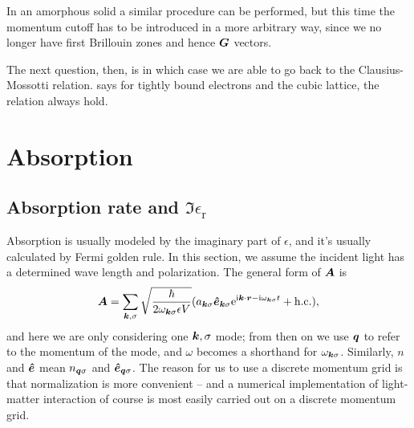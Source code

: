 \documentclass[hyperref, a4paper, 12pt]{report}
\newcommand*{\ii}{\mathrm{i}}
\newcommand*{\ee}{\mathrm{e}}
\begin{document}
In an amorphous solid a similar procedure can be performed, 
but this time the momentum cutoff has to be introduced 
in a more arbitrary way,
since we no longer have first Brillouin zones 
and hence $\vb*{G}$ vectors. 

The next question, then, is in which case we are able to 
go back to the Clausius-Mossotti relation.
\cite{wider63} says for tightly bound electrons 
and the cubic lattice, 
the relation always hold.

\section{Absorption}

\subsection{Absorption rate and $\Im \epsilon_{\text{r}}$}

Absorption is usually modeled by the imaginary part of $\epsilon$,
and it's usually calculated by Fermi golden rule.
In this section, we assume the incident light 
has a determined wave length and polarization.
The general form of $\vb*{A}$ is 
\begin{equation}
    \vb*{A} = \sum_{\vb*{k}, \sigma}
        \sqrt{\frac{\hbar}{2 \omega_{\vb*{k} \sigma} \epsilon V}}
        (
            a_{\vb*{k} \sigma} \vu*{e}_{\vb*{k} \sigma} 
            \ee^{\ii \vb*{k} \cdot \vb*{r} - \ii \omega_{\vb*{k} \sigma} t}
            + \text{h.c.}
        ),
    \label{eq:a-and-photon}
\end{equation}
and here we are only considering one $\vb*{k}, \sigma$ mode; 
from then on we use $\vb*{q}$ to refer to the momentum of the mode,
and $\omega$ becomes a shorthand for $\omega_{\vb*{k} \sigma}$.
Similarly, $n$ and $\vu*{e}$ mean 
$n_{\vb*{q} \sigma}$ and $\vu*{e}_{\vb*{q} \sigma}$.
The reason for us to use a discrete momentum grid 
is that normalization is more convenient -- 
and a numerical implementation of light-matter interaction
of course is most easily carried out 
on a discrete momentum grid.
\end{document}
